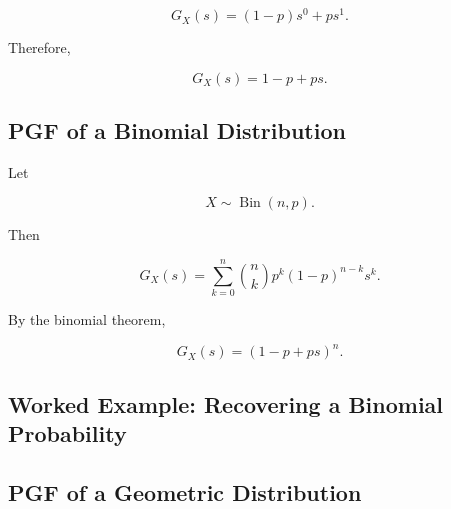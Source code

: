 \[
G_X(s)
=
(1-p)s^0+ps^1.
\]

Therefore,

\[
\boxed{
G_X(s)
=
1-p+ps.
}
\]

\subsection{PGF of a Binomial Distribution}
\label{subsec:pgf-binomial}

Let

\[
X\sim\operatorname{Bin}(n,p).
\]

Then

\[
G_X(s)
=
\sum_{k=0}^{n}
\binom nk
p^k(1-p)^{n-k}s^k.
\]

By the binomial theorem,

\[
\boxed{
G_X(s)
=
(1-p+ps)^n.
}
\]

\subsection{Worked Example: Recovering a Binomial Probability}
\label{subsec:worked-pgf-binomial-coefficient}


\subsection{PGF of a Geometric Distribution}
\label{subsec:pgf-geometric}

